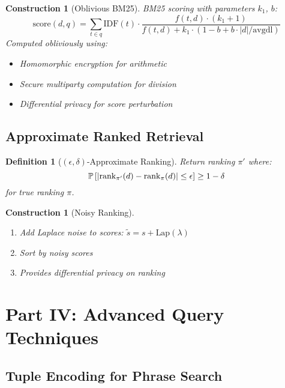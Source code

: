 \documentclass[11pt,final]{article}
\newtheorem{definition}[theorem]{Definition}
\newtheorem{construction}[theorem]{Construction}
\begin{document}
\begin{construction}[Oblivious BM25]
BM25 scoring with parameters $k_1$, $b$:
\begin{equation}
\text{score}(d, q) = \sum_{t \in q} \text{IDF}(t) \cdot \frac{f(t, d) \cdot (k_1 + 1)}{f(t, d) + k_1 \cdot (1 - b + b \cdot |d|/\text{avgdl})}
\end{equation}
Computed obliviously using:
\begin{itemize}
    \item Homomorphic encryption for arithmetic
    \item Secure multiparty computation for division
    \item Differential privacy for score perturbation
\end{itemize}
\end{construction}

\subsection{Approximate Ranked Retrieval}

\begin{definition}[$(\epsilon, \delta)$-Approximate Ranking]
Return ranking $\pi'$ where:
\begin{equation}
\mathbb{P}\left[|\text{rank}_{\pi'}(d) - \text{rank}_{\pi}(d)| \leq \epsilon\right] \geq 1 - \delta
\end{equation}
for true ranking $\pi$.
\end{definition}

\begin{construction}[Noisy Ranking]
\begin{enumerate}
    \item Add Laplace noise to scores: $\tilde{s} = s + \text{Lap}(\lambda)$
    \item Sort by noisy scores
    \item Provides differential privacy on ranking
\end{enumerate}
\end{construction}

\section{Part IV: Advanced Query Techniques}

\subsection{Tuple Encoding for Phrase Search}
\end{document}
